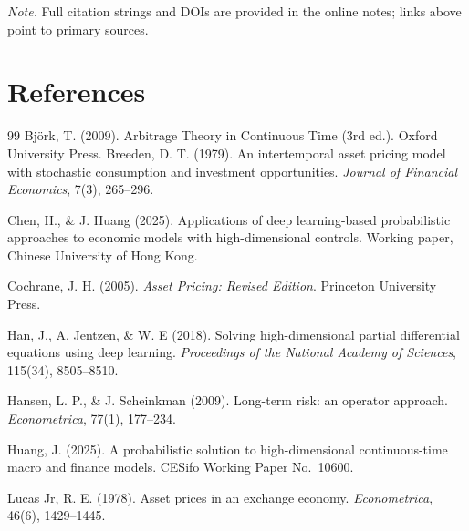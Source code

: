﻿\documentclass[11pt,letterpaper,oneside]{article}
\numberwithin{equation}{section}
\newcommand{\1}{\mathbf{1}}
\begin{document}
\medskip
\noindent\emph{Note.} Full citation strings and DOIs are provided in the online notes; links above point to primary sources.

\section*{References}
\begin{thebibliography}{99}\small
{} Bj\"ork, T. (2009).
Arbitrage Theory in Continuous Time (3rd ed.).
Oxford University Press.
 Breeden, D. T. (1979).
An intertemporal asset pricing model with stochastic consumption and investment opportunities.
\emph{Journal of Financial Economics}, 7(3), 265--296.

 Chen, H., \& J. Huang (2025).
Applications of deep learning-based probabilistic approaches to economic models with high-dimensional controls.
Working paper, Chinese University of Hong Kong.

 Cochrane, J. H. (2005).
\emph{Asset Pricing: Revised Edition}.
Princeton University Press.

 Han, J., A. Jentzen, \& W. E (2018).
Solving high-dimensional partial differential equations using deep learning.
\emph{Proceedings of the National Academy of Sciences}, 115(34), 8505--8510.

 Hansen, L. P., \& J. Scheinkman (2009).
Long-term risk: an operator approach.
\emph{Econometrica}, 77(1), 177--234.

 Huang, J. (2025).
A probabilistic solution to high-dimensional continuous-time macro and finance models.
CESifo Working Paper No.~10600.

 Lucas Jr, R. E. (1978).
Asset prices in an exchange economy.
\emph{Econometrica}, 46(6), 1429--1445.
\end{thebibliography}
\end{document}
